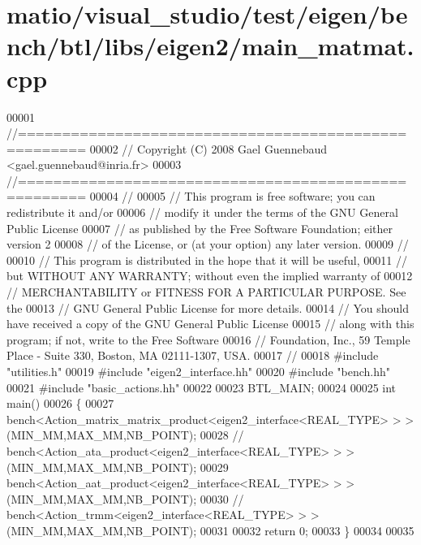 \hypertarget{matio_2visual__studio_2test_2eigen_2bench_2btl_2libs_2eigen2_2main__matmat_8cpp_source}{}\section{matio/visual\+\_\+studio/test/eigen/bench/btl/libs/eigen2/main\+\_\+matmat.cpp}
\label{matio_2visual__studio_2test_2eigen_2bench_2btl_2libs_2eigen2_2main__matmat_8cpp_source}

\begin{DoxyCode}
00001 \textcolor{comment}{//=====================================================}
00002 \textcolor{comment}{// Copyright (C) 2008 Gael Guennebaud <gael.guennebaud@inria.fr>}
00003 \textcolor{comment}{//=====================================================}
00004 \textcolor{comment}{//}
00005 \textcolor{comment}{// This program is free software; you can redistribute it and/or}
00006 \textcolor{comment}{// modify it under the terms of the GNU General Public License}
00007 \textcolor{comment}{// as published by the Free Software Foundation; either version 2}
00008 \textcolor{comment}{// of the License, or (at your option) any later version.}
00009 \textcolor{comment}{//}
00010 \textcolor{comment}{// This program is distributed in the hope that it will be useful,}
00011 \textcolor{comment}{// but WITHOUT ANY WARRANTY; without even the implied warranty of}
00012 \textcolor{comment}{// MERCHANTABILITY or FITNESS FOR A PARTICULAR PURPOSE.  See the}
00013 \textcolor{comment}{// GNU General Public License for more details.}
00014 \textcolor{comment}{// You should have received a copy of the GNU General Public License}
00015 \textcolor{comment}{// along with this program; if not, write to the Free Software}
00016 \textcolor{comment}{// Foundation, Inc., 59 Temple Place - Suite 330, Boston, MA  02111-1307, USA.}
00017 \textcolor{comment}{//}
00018 \textcolor{preprocessor}{#include "utilities.h"}
00019 \textcolor{preprocessor}{#include "eigen2\_interface.hh"}
00020 \textcolor{preprocessor}{#include "bench.hh"}
00021 \textcolor{preprocessor}{#include "basic\_actions.hh"}
00022 
00023 BTL\_MAIN;
00024 
00025 \textcolor{keywordtype}{int} main()
00026 \{
00027   bench<Action\_matrix\_matrix\_product<eigen2\_interface<REAL\_TYPE> > >(MIN\_MM,MAX\_MM,NB\_POINT);
00028 \textcolor{comment}{//   bench<Action\_ata\_product<eigen2\_interface<REAL\_TYPE> > >(MIN\_MM,MAX\_MM,NB\_POINT);}
00029   bench<Action\_aat\_product<eigen2\_interface<REAL\_TYPE> > >(MIN\_MM,MAX\_MM,NB\_POINT);
00030 \textcolor{comment}{//   bench<Action\_trmm<eigen2\_interface<REAL\_TYPE> > >(MIN\_MM,MAX\_MM,NB\_POINT);}
00031 
00032   \textcolor{keywordflow}{return} 0;
00033 \}
00034 
00035 
\end{DoxyCode}
